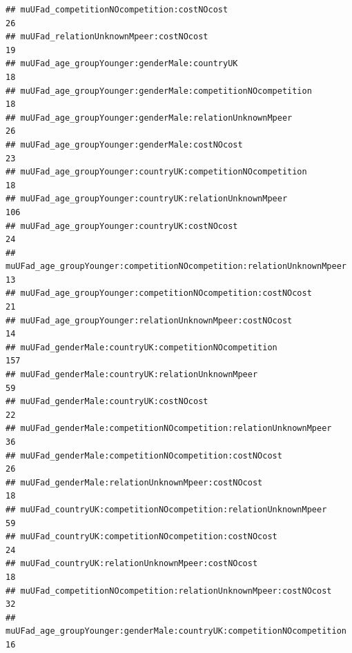 \documentclass[
]{article}
\begin{document}
\begin{verbatim}
## muUFad_competitionNOcompetition:costNOcost                                                                   26
## muUFad_relationUnknownMpeer:costNOcost                                                                       19
## muUFad_age_groupYounger:genderMale:countryUK                                                                 18
## muUFad_age_groupYounger:genderMale:competitionNOcompetition                                                  18
## muUFad_age_groupYounger:genderMale:relationUnknownMpeer                                                      26
## muUFad_age_groupYounger:genderMale:costNOcost                                                                23
## muUFad_age_groupYounger:countryUK:competitionNOcompetition                                                   18
## muUFad_age_groupYounger:countryUK:relationUnknownMpeer                                                      106
## muUFad_age_groupYounger:countryUK:costNOcost                                                                 24
## muUFad_age_groupYounger:competitionNOcompetition:relationUnknownMpeer                                        13
## muUFad_age_groupYounger:competitionNOcompetition:costNOcost                                                  21
## muUFad_age_groupYounger:relationUnknownMpeer:costNOcost                                                      14
## muUFad_genderMale:countryUK:competitionNOcompetition                                                        157
## muUFad_genderMale:countryUK:relationUnknownMpeer                                                             59
## muUFad_genderMale:countryUK:costNOcost                                                                       22
## muUFad_genderMale:competitionNOcompetition:relationUnknownMpeer                                              36
## muUFad_genderMale:competitionNOcompetition:costNOcost                                                        26
## muUFad_genderMale:relationUnknownMpeer:costNOcost                                                            18
## muUFad_countryUK:competitionNOcompetition:relationUnknownMpeer                                               59
## muUFad_countryUK:competitionNOcompetition:costNOcost                                                         24
## muUFad_countryUK:relationUnknownMpeer:costNOcost                                                             18
## muUFad_competitionNOcompetition:relationUnknownMpeer:costNOcost                                              32
## muUFad_age_groupYounger:genderMale:countryUK:competitionNOcompetition                                        16

\end{verbatim}
\end{document}
